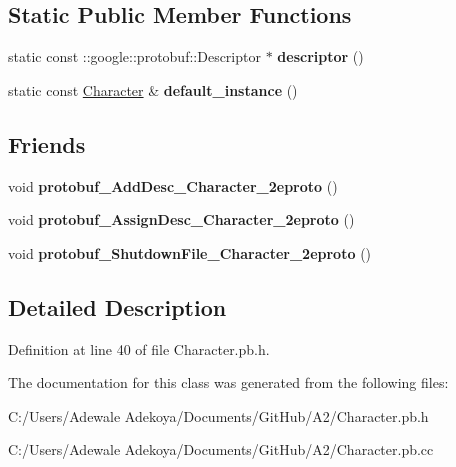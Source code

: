 \subsection*{Static Public Member Functions}
\begin{DoxyCompactItemize}
\item 
\hypertarget{classproto_1_1_character_af5ece1da02fa96963d539411dbc4b65f}{}static const \+::google\+::protobuf\+::\+Descriptor $\ast$ {\bfseries descriptor} ()\label{classproto_1_1_character_af5ece1da02fa96963d539411dbc4b65f}

\item 
\hypertarget{classproto_1_1_character_ad616cfe1d5e99d64cf20493e6a122b68}{}static const \hyperlink{classproto_1_1_character}{Character} \& {\bfseries default\+\_\+instance} ()\label{classproto_1_1_character_ad616cfe1d5e99d64cf20493e6a122b68}

\end{DoxyCompactItemize}
\subsection*{Friends}
\begin{DoxyCompactItemize}
\item 
\hypertarget{classproto_1_1_character_adef05d207947d9b35b104f4d265cb814}{}void {\bfseries protobuf\+\_\+\+Add\+Desc\+\_\+\+Character\+\_\+2eproto} ()\label{classproto_1_1_character_adef05d207947d9b35b104f4d265cb814}

\item 
\hypertarget{classproto_1_1_character_a60f31d05ed7be3be9b60eec3dce13a63}{}void {\bfseries protobuf\+\_\+\+Assign\+Desc\+\_\+\+Character\+\_\+2eproto} ()\label{classproto_1_1_character_a60f31d05ed7be3be9b60eec3dce13a63}

\item 
\hypertarget{classproto_1_1_character_af5b2da6541a81a0d17644f512d753edc}{}void {\bfseries protobuf\+\_\+\+Shutdown\+File\+\_\+\+Character\+\_\+2eproto} ()\label{classproto_1_1_character_af5b2da6541a81a0d17644f512d753edc}

\end{DoxyCompactItemize}


\subsection{Detailed Description}


Definition at line 40 of file Character.\+pb.\+h.



The documentation for this class was generated from the following files\+:\begin{DoxyCompactItemize}
\item 
C\+:/\+Users/\+Adewale Adekoya/\+Documents/\+Git\+Hub/\+A2/Character.\+pb.\+h\item 
C\+:/\+Users/\+Adewale Adekoya/\+Documents/\+Git\+Hub/\+A2/Character.\+pb.\+cc\end{DoxyCompactItemize}
